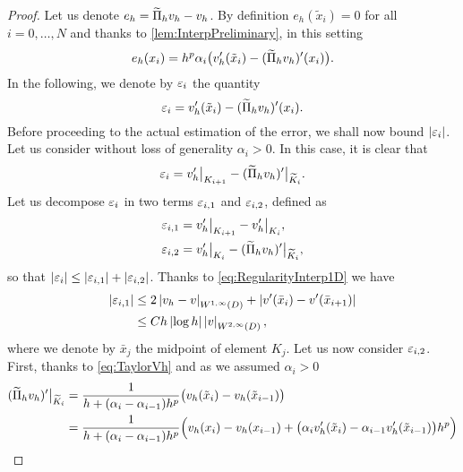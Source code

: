 \documentclass[10pt]{article}
\begin{document}
\begin{proof} Let us denote $e_h = \widetilde \Pi_h v_h - v_h$. By definition $e_h(\tilde x_i) = 0$ for all $i = 0, \ldots, N$ and thanks to \cref{lem:InterpPreliminary}, in this setting
	\begin{equation}\label{eq:OneDNodes}
		e_h(x_i) = h^p \alpha_i \big(v_h'(\tilde x_i) - (\widetilde \Pi_hv_h)'(x_i)\big).
	\end{equation}
	In the following, we denote by $\varepsilon_i$ the quantity
	\begin{equation}
		\varepsilon_i = v_h'(\tilde x_i) - (\widetilde \Pi_hv_h)'(x_i).
	\end{equation}
	Before proceeding to the actual estimation of the error, we shall now bound $\left\lvert\varepsilon_i\right\rvert$. Let us consider without loss of generality $\alpha_i > 0$. In this case, it is clear that 
	\begin{equation}
		\varepsilon_i = v_h'\bigr\rvert_{K_{i+1}} - (\widetilde \Pi_hv_h)'\bigr\rvert_{\widetilde K_i}.
	\end{equation}
	Let us decompose $\varepsilon_i$ in two terms $\varepsilon_{i, 1}$ and $\varepsilon_{i, 2}$, defined as
	\begin{equation}
	\begin{aligned}
		\varepsilon_{i, 1} &= v_h'\bigr\rvert_{K_{i+1}} - v_h'\bigr\rvert_{K_i}, \\
		\varepsilon_{i, 2} &= v_h'\bigr\rvert_{K_i} - (\widetilde \Pi_hv_h)'\bigr\rvert_{\widetilde K_i},
	\end{aligned}	
	\end{equation}
	so that $\left\lvert\varepsilon_i\right\rvert \leq \left\lvert\varepsilon_{i, 1}\right\rvert + \left\lvert\varepsilon_{i, 2}\right\rvert$. Thanks to \eqref{eq:RegularityInterp1D} we have
	\begin{equation}\label{eq:gradDiffSmooth1d}
	\begin{aligned}
		\left\lvert\varepsilon_{i, 1}\right\rvert &\leq 2 \left\lvert v_h - v\right\rvert_{W^{1,\infty}(D)} + \left\lvert v'(\bar x_i) - v'(\bar x_{i+1})\right\rvert\\
		&\leq C h \left\lvert\log h\right\rvert \left\lvert v\right\rvert_{W^{2, \infty}(D)},
	\end{aligned}
	\end{equation}
	where we denote by $\bar x_j$ the midpoint of element $K_j$. Let us now consider $\varepsilon_{i, 2}$. First, thanks to \eqref{eq:TaylorVh} and as we assumed $\alpha_i > 0$
	\begin{equation}
	\begin{aligned}
		(\btilde \Pi_hv_h)'\eval{\btilde K_i} &= \frac{1}{h + (\alpha_i - \alpha_{i-1})h^p} \big(v_h(\tilde x_i) - v_h(\tilde x_{i-1})\big) \\
		&= \frac{1}{h + (\alpha_i  - \alpha_{i-1})h^p} \Big(v_h(x_i) - v_h(x_{i-1}) + \big(\alpha_i v_h'(\tilde x_i) - \alpha_{i-1} v_h'(\tilde x_{i-1}) \big)h^p\Big)\\

\end{aligned}
\end{equation}
\end{proof}
\end{document}
